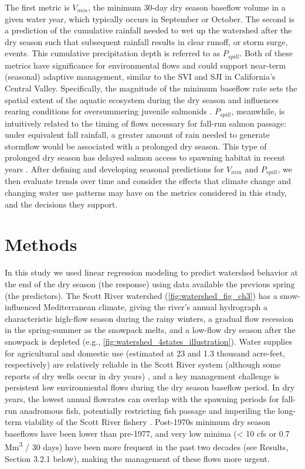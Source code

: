 \documentclass[hess, manuscript]{copernicus}
\begin{document}
The first metric is \(V_{min}\), the minimum 30-day dry season baseflow
volume in a given water year, which typically occurs in September or
October. The second is a prediction of the cumulative rainfall needed to
wet up the watershed after the dry season such that subsequent rainfall
results in clear runoff, or storm surge, events. This cumulative
precipitation depth is referred to as \(P_{spill}\). Both of these
metrics have significance for environmental flows and could support
near-term (seasonal) adaptive management, similar to the SVI and SJI in
California's Central Valley. Specifically, the magnitude of the minimum
baseflow rate sets the spatial extent of the aquatic ecosystem during
the dry season and influences rearing conditions for oversummering
juvenile salmonids \citep{Gorman2016}. \(P_{spill}\), meanwhile, is
intuitively related to the timing of flows necessary for fall-run salmon
passage: under equivalent fall rainfall, a greater amount of rain needed
to generate stormflow would be associated with a prolonged dry season.
This type of prolonged dry season has delayed salmon access to spawning
habitat in recent years \citeyearpar[CDFW][]{CDFW2015a}. After defining
and developing seasonal predictions for \(V_{min}\) and \(P_{spill}\),
we then evaluate trends over time and consider the effects that climate
change and changing water use patterns may have on the metrics
considered in this study, and the decisions they support.

\section{Methods}

In this study we used linear regression modeling to predict watershed
behavior at the end of the dry season (the response) using data
available the previous spring (the predictors). The Scott River
watershed (\autoref{fig:watershed_fig_ch3}) has a snow-influenced
Mediterranean climate, giving the river's annual hydrograph a
characteristic high-flow season during the rainy winters, a gradual flow
recession in the spring-summer as the snowpack melts, and a low-flow dry
season after the snowpack is depleted (e.g.,
\autoref{fig:watershed_4states_illustration}). Water supplies for
agricultural and domestic use (estimated at 23 and 1.3 thousand
acre-feet, respectively) \citeyearpar[DWR][]{DWR2004} are relatively
reliable in the Scott River system (although some reports of dry wells
occur in dry years) \citeyearpar[Siskiyou County][]{SiskiyouCounty2021},
and a key management challenge is persistent low environmental flows
during the dry season baseflow period. In dry years, the lowest annual
flowrates can overlap with the spawning periods for fall-run anadromous
fish, potentially restricting fish passage and imperiling the long-term
viability of the Scott River fishery \citeyearpar[Siskiyou
County][]{SiskiyouCounty2021}. Post-1970s minimum dry season baseflows
have been lower than pre-1977, and very low minima (\textless{} 10 cfs
or 0.7 Mm\textsuperscript{3} / 30 days) have been more frequent in the
past two decades (see Results, Section 3.2.1 below), making the
management of these flows more urgent.
\end{document}
